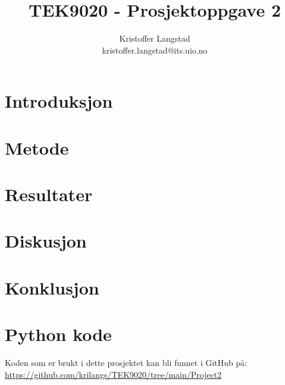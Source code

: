 \documentclass[twocolumn,norwegian]{article}
\title{TEK9020 - Prosjektoppgave 2}
\author{Kristoffer Langstad \\ kristoffer.langstad@its.uio.no}
\date{}
\begin{document}
	
	\maketitle
	
	\section{Introduksjon}

	
	
	\section{Metode}
	
	
	
	\section{Resultater}
	
	
	\section{Diskusjon}
	
	
	\section{Konklusjon}
	
	
	\appendix
	\section{Python kode}
	Koden som er brukt i dette prosjektet kan bli funnet i GitHub på: \url{https://github.com/krilangs/TEK9020/tree/main/Project2}
	
\end{document}
